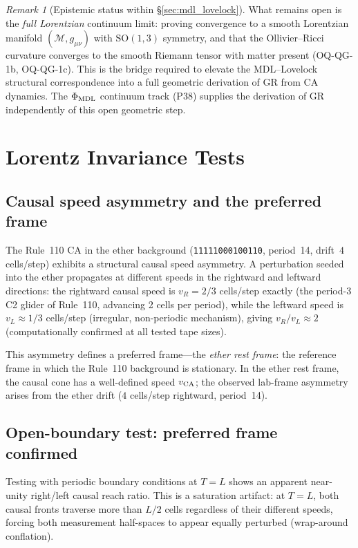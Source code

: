 \documentclass[11pt]{article}
\theoremstyle{remark}
\newtheorem{remark}[theorem]{Remark}
\begin{document}
\begin{remark}[Epistemic status within \S\ref{sec:mdl_lovelock}]
What remains open is the \emph{full Lorentzian} continuum limit: proving convergence
to a smooth Lorentzian manifold $(\mathcal{M}, g_{\mu\nu})$ with $\mathrm{SO}(1,3)$
symmetry, and that the Ollivier--Ricci curvature converges to the smooth Riemann tensor
with matter present (OQ-QG-1b, OQ-QG-1c). This is the bridge required to elevate the
MDL--Lovelock structural correspondence into a full geometric derivation of GR from CA
dynamics. The $\Phi_{\rm MDL}$ continuum track (P38) supplies the derivation of GR
independently of this open geometric step.
\end{remark}

\section{Lorentz Invariance Tests}
\label{sec:lorentz}

\subsection{Causal speed asymmetry and the preferred frame}
\label{ssec:lorentz_asymmetry}

The Rule~110 CA in the ether background (\texttt{11111000100110},
period~14, drift~$4$ cells/step) exhibits a structural causal speed
asymmetry.
A perturbation seeded into the ether propagates at different speeds in the
rightward and leftward directions:
the rightward causal speed is $v_R = 2/3$ cells/step exactly (the period-3
C2 glider of Rule~110, advancing 2 cells per period), while the leftward
speed is $v_L \approx 1/3$ cells/step (irregular, non-periodic mechanism),
giving $v_R / v_L \approx 2$ (computationally confirmed at all tested tape sizes).

This asymmetry defines a preferred frame---the \emph{ether rest frame}:
the reference frame in which the Rule~110 background is stationary.
In the ether rest frame, the causal cone has a well-defined speed $v_{\rm CA}$;
the observed lab-frame asymmetry arises from the ether drift ($4$ cells/step
rightward, period~14).

\subsection{Open-boundary test: preferred frame confirmed}
\label{ssec:lorentz_open}

Testing with periodic boundary conditions at $T = L$ shows an apparent
near-unity right/left causal reach ratio.
This is a saturation artifact: at $T = L$, both causal fronts traverse
more than $L/2$ cells regardless of their different speeds, forcing both
measurement half-spaces to appear equally perturbed (wrap-around conflation).
\end{document}
